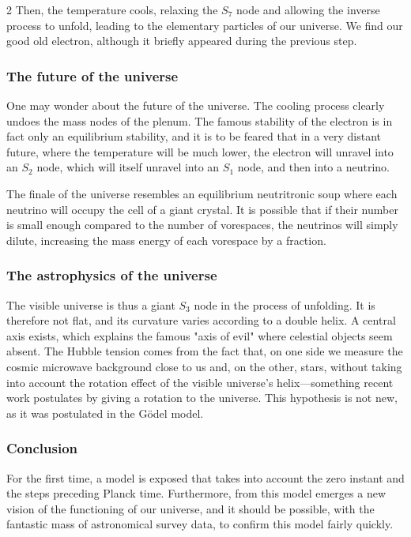 \begin{multicols}{2}
	Then, the temperature cools, relaxing the $S_7$ node and allowing the inverse process to unfold, leading to the elementary particles of our universe. We find our good old electron, although it briefly appeared during the previous step.
	
	\subsubsection{The future of the universe}
	
	One may wonder about the future of the universe. The cooling process clearly undoes the mass nodes of the plenum. The famous stability of the electron is in fact only an equilibrium stability, and it is to be feared that in a very distant future, where the temperature will be much lower, the electron will unravel into an $S_2$ node, which will itself unravel into an $S_1$ node, and then into a neutrino.
	
	The finale of the universe resembles an equilibrium neutritronic soup where each neutrino will occupy the cell of a giant crystal. It is possible that if their number is small enough compared to the number of vorespaces, the neutrinos will simply dilute, increasing the mass energy of each vorespace by a fraction.
	
	\subsubsection{The astrophysics of the universe}
	
	The visible universe is thus a giant $S_3$ node in the process of unfolding. It is therefore not flat, and its curvature varies according to a double helix. A central axis exists, which explains the famous "axis of evil" where celestial objects seem absent. The Hubble tension comes from the fact that, on one side we measure the cosmic microwave background close to us and, on the other, stars, without taking into account the rotation effect of the visible universe's helix—something recent work postulates by giving a rotation to the universe\cite{lodha2024hubble}. This hypothesis is not new, as it was postulated in the Gödel model\cite{godel1949example}.
	
	\subsubsection{Conclusion}
	
	For the first time, a model is exposed that takes into account the zero instant and the steps preceding Planck time. Furthermore, from this model emerges a new vision of the functioning of our universe, and it should be possible, with the fantastic mass of astronomical survey data, to confirm this model fairly quickly.
	

\end{multicols}
